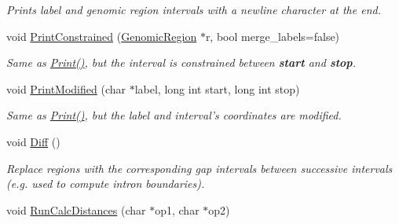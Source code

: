\begin{CompactItemize}
\begin{CompactList}\small\item\em Prints label and genomic region intervals with a newline character at the end. \item\end{CompactList}\item 
\hypertarget{classGenomicRegionGFF_96539f4372048c9f0d87826f5856a8ef}{
void \hyperlink{classGenomicRegionGFF_96539f4372048c9f0d87826f5856a8ef}{PrintConstrained} (\hyperlink{classGenomicRegion}{GenomicRegion} $\ast$r, bool merge\_\-labels=false)}
\label{classGenomicRegionGFF_96539f4372048c9f0d87826f5856a8ef}

\begin{CompactList}\small\item\em Same as \hyperlink{classGenomicRegionGFF_3ffa71d729e4ff060a15a6bab1e924c8}{Print()}, but the interval is constrained between {\bf start} and {\bf stop}. \item\end{CompactList}\item 
\hypertarget{classGenomicRegionGFF_4b331cd12506aa4793a2cf6ea7620936}{
void \hyperlink{classGenomicRegionGFF_4b331cd12506aa4793a2cf6ea7620936}{PrintModified} (char $\ast$label, long int start, long int stop)}
\label{classGenomicRegionGFF_4b331cd12506aa4793a2cf6ea7620936}

\begin{CompactList}\small\item\em Same as \hyperlink{classGenomicRegionGFF_3ffa71d729e4ff060a15a6bab1e924c8}{Print()}, but the label and interval's coordinates are modified. \item\end{CompactList}\item 
\hypertarget{classGenomicRegionGFF_ee70fcc81c9a6629bf0aa1ec37cb1d64}{
void \hyperlink{classGenomicRegionGFF_ee70fcc81c9a6629bf0aa1ec37cb1d64}{Diff} ()}
\label{classGenomicRegionGFF_ee70fcc81c9a6629bf0aa1ec37cb1d64}

\begin{CompactList}\small\item\em Replace regions with the corresponding gap intervals between successive intervals (e.g. used to compute intron boundaries). \item\end{CompactList}\item 
\hypertarget{classGenomicRegionGFF_0ff4768578a03011fabad309072fade4}{
void \hyperlink{classGenomicRegionGFF_0ff4768578a03011fabad309072fade4}{RunCalcDistances} (char $\ast$op1, char $\ast$op2)}
\label{classGenomicRegionGFF_0ff4768578a03011fabad309072fade4}


\end{CompactItemize}
